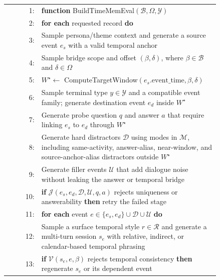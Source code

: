 \begin{tcolorbox}
  \vspace{0.25em}
  \begin{tabular}{@{}r@{\quad}p{0.84\linewidth}@{}}
  1: & \textbf{function} BuildTimeMemEval$(\mathcal{B},\Omega,\mathcal{Y})$ \\
  2: & \hspace*{1em}\textbf{for each} requested record \textbf{do} \\
  3: & \hspace*{2em}Sample persona/theme context and generate a source event $e_s$ with a valid temporal anchor \\
  4: & \hspace*{2em}Sample bridge scope and offset $(\beta,\delta)$, where $\beta\in\mathcal{B}$ and $\delta\in\Omega$ \\
  5: & \hspace*{2em}$W^\star \leftarrow$ ComputeTargetWindow$(e_s.\mathrm{event\_time},\beta,\delta)$ \\
  6: & \hspace*{2em}Sample terminal type $y\in\mathcal{Y}$ and a compatible event family; generate destination event $e_d$ inside $W^\star$ \\
  7: & \hspace*{2em}Generate probe question $q$ and answer $a$ that require linking $e_s$ to $e_d$ through $W^\star$ \\
  8: & \hspace*{2em}Generate hard distractors $\mathcal{D}$ using modes in $\mathcal{M}$, including same-activity, answer-alias, near-window, and source-anchor-alias distractors outside $W^\star$ \\
  9: & \hspace*{2em}Generate filler events $\mathcal{U}$ that add dialogue noise without leaking the answer or temporal bridge \\
  10: & \hspace*{2em}\textbf{if} $\mathcal{J}(e_s,e_d,\mathcal{D},\mathcal{U},q,a)$ rejects uniqueness or answerability \textbf{then} retry the failed stage \\
  11: & \hspace*{2em}\textbf{for each} event $e\in\{e_s,e_d\}\cup\mathcal{D}\cup\mathcal{U}$ \textbf{do} \\
  12: & \hspace*{3em}Sample a surface temporal style $r\in\mathcal{R}$ and generate a multi-turn session $s_e$ with relative, indirect, or calendar-based temporal phrasing \\
  13: & \hspace*{3em}\textbf{if} $\mathcal{V}(s_e,e,\beta)$ rejects temporal consistency \textbf{then} regenerate $s_e$ or its dependent event \\

\end{tabular}
\end{tcolorbox}
